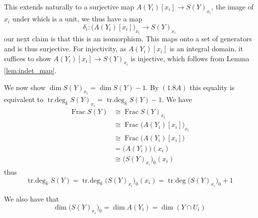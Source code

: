 \documentclass[12pt]{article}
\numberwithin{thm}{subsection}
\numberwithin{defn}{subsection}
\numberwithin{lemma}{subsection}
\numberwithin{example}{subsection}
\numberwithin{notation}{subsection}
\numberwithin{cor}{subsection}
\numberwithin{remark}{subsection}
\numberwithin{condition}{subsection}
\numberwithin{question}{subsection}
\numberwithin{construction}{subsection}
\numberwithin{construction}{subsection}
\numberwithin{construction}{subsection}
\newcommand{\lto}{\longrightarrow}
\begin{document}
This extends naturally to a surjective map $A(Y_i)[x_i] \lto S(Y)_{x_i}$, the image of $x_i$ under which is a unit, we thus have a map 
\[
    \delta_i: \big(A(Y_i)[x_i]\big)_{x_i} \lto S(Y)_{x_i}
\]
our next claim is that this is an isomorphism. This maps onto a set of generators and is thus surjective. For injectivity, as $A(Y_i)[x_i]$ is an integral domain, it suffices to show $A(Y_i)[x_i] \lto S(Y)_{x_i}$ is injective, which follows from Lemma \ref{lem:indet_map}.

We now show $\operatorname{dim}S(Y)_{x_i} = \operatorname{dim}S(Y) - 1$. By $(1.8A)$ this equality is equivalent to $\operatorname{tr.deg}_kS(Y)_{x_i} = \operatorname{tr.deg}_kS(Y) - 1$. We have
\begin{align*}
\operatorname{Frac}S(Y) &\cong \operatorname{Frac}S(Y)_{x_i}\\
&\cong\operatorname{Frac}\big(A(Y_i)[x_i]\big)_{x_i}\\
&\cong \operatorname{Frac}\big(A(Y_i)[x_i]\big)\\
&= \big(A(Y_i)\big)(x_i)\\
&\cong \big(S(Y)_{x_i}\big)_0(x_i)
\end{align*}
thus
\[\operatorname{tr.deg}_kS(Y) = \operatorname{tr.deg}_k\big(S(Y)_{x_i}\big)_0(x_i) = \operatorname{tr.deg}\big(S(Y)_{x_i}\big)_0 + 1\]

We also have that
\[\operatorname{dim}\big(S(Y)_{x_i}\big)_0 = \operatorname{dim}A(Y_i) = \operatorname{dim}(Y \cap U_i)\]
\end{document}
